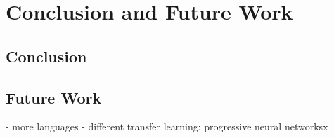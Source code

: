 \section{Conclusion and Future Work}

\subsection{Conclusion}
\subsection{Future Work}


- more languages
- different transfer learning: progressive neural networksx